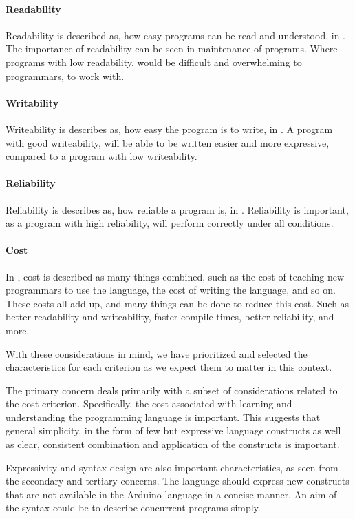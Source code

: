 \paragraph{Readability}
Readability is described as, how easy programs can be read and understood, in . The importance of readability can be seen in maintenance of programs. Where programs with low readability, would be difficult and overwhelming to programmars, to work with. 

\paragraph{Writability}
Writeability is describes as, how easy the program is to write, in . A program with good writeability, will be able to be written easier and more expressive, compared to a program with low writeability. 

\paragraph*{Reliability}
Reliability is describes as, how reliable a program is, in . Reliability is important, as a program with high reliability, will perform correctly under all conditions.

\paragraph*{Cost}
In , cost is described as many things combined, such as the cost of teaching new programmars to use the language, the cost of writing the language, and so on. These costs all add up, and many things can be done to reduce this cost. Such as better readability and writeability, faster compile times, better reliability, and more.


With these considerations in mind, we have prioritized and selected the characteristics for each criterion as we expect them to matter in this context.

The primary concern deals primarily with a subset of considerations related to the cost criterion. Specifically, the cost associated with learning and understanding the programming language is important. This suggests that general simplicity, in the form of few but expressive language constructs as well as clear, consistent combination and application of the constructs is important.

Expressivity and syntax design are also important characteristics, as seen from the secondary and tertiary concerns. The language should express new constructs that are not available in the Arduino language in a concise manner. An aim of the syntax could be to describe concurrent programs simply.

